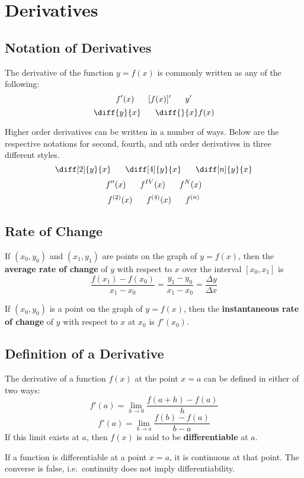 \documentclass{artikel3}
\begin{document}
\section{Derivatives}

\subsection{Notation of Derivatives}
The derivative of the function $y=f(x)$ is commonly written as any of the following:
\[ f'(x)\hspace{6 mm}[f(x)]'\hspace{6 mm}y'\]
\[ \diff{y}{x}\hspace{6 mm}\diff{}{x}f(x) \]

Higher order derivatives can be written in a number of ways. Below are the 
respective notations for second, fourth, and nth order derivatives in three different styles.
\[ \diff[2]{y}{x}\hspace{6 mm}\diff[4]{y}{x}\hspace{6 mm}\diff[n]{y}{x} \]
\[ f''(x)\hspace{6 mm}f^{IV}(x)\hspace{6 mm}f^{N}(x) \]
\[ f^{(2)}(x)\hspace{6 mm}f^{(4)}(x)\hspace{6 mm}f^{(n)} \]

\subsection{Rate of Change}
If $(x_0,y_0)$ and $(x_1,y_1)$ are points on the graph of $y=f(x)$, then 
the \textbf{average rate of change} of $y$ with respect to $x$ over 
the interval $[x_0,x_1]$ is
\[ \frac{f(x_1)-f(x_0)}{x_1-x_0}=\frac{y_1-y_0}{x_1-x_0}=\frac{\Delta y}{\Delta x} \]

If $(x_0,y_0)$ is a point on the graph of $y=f(x)$, then the \textbf{instantaneous 
rate of change} of $y$ with respect to $x$ at $x_0$ is $f'(x_0)$.

\subsection{Definition of a Derivative}
The derivative of a function $f(x)$ at the point $x=a$ can be defined in either of two ways:
\[ f'(a)=\lim_{h \to 0}\frac{f(a+h)-f(a)}{h} \]
\[ f'(a)=\lim_{b \to a}\frac{f(b)-f(a)}{b-a} \]
If this limit exists at $a$, then $f(x)$ is said to be \textbf{differentiable} at $a$.

If a function is differentiable at a point $x=a$, it is continuous at that point.
The converse is false, i.e.\ continuity does not imply differentiability.
\end{document}
